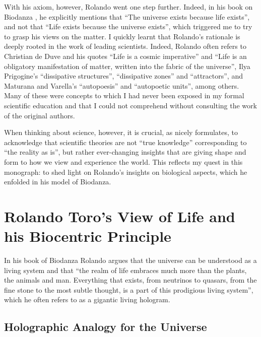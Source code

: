 \documentclass[
  11pt,
]{book}
\begin{document}
With his axiom, however, Rolando went one step further. Indeed, in his book on Biodanza \citep{toro2008}, he explicitly mentions that ``The universe exists because life exists'', and not that ``Life exists because the universe exists'', which triggered me to try to grasp his views on the matter. I quickly learnt that Rolando's rationale is deeply rooted in the work of leading scientists. Indeed, Rolando often refers to Christian de Duve and his quotes ``Life is a cosmic imperative'' and ``Life is an obligatory manifestation of matter, written into the fabric of the universe'', Ilya Prigogine's ``dissipative structures'', ``dissipative zones'' and ``attractors'', and Maturana and Varella's ``autopoesis'' and ``autopoetic units'', among others. Many of these were concepts to which I had never been exposed in my formal scientific education and that I could not comprehend without consulting the work of the original authors.

When thinking about science, however, it is crucial, as \citet{bohm1980} nicely formulates, to acknowledge that scientific theories are not ``true knowledge'' corresponding to ``the reality as is'', but rather ever-changing insights that are giving shape and form to how we view and experience the world. This reflects my quest in this monograph: to shed light on Rolando's insights on biological aspects, which he enfolded in his model of Biodanza.

\hypertarget{rolando-toros-view-of-life-and-his-biocentric-principle}{%
\section{Rolando Toro's View of Life and his Biocentric Principle}\label{rolando-toros-view-of-life-and-his-biocentric-principle}}

In his book of Biodanza Rolando argues that the universe can be understood as a living system and that ``the realm of life embraces much more than the plants, the animals and man. Everything that exists, from neutrinos to quasars, from the fine stone to the most subtle thought, is a part of this prodigious living system'', which he often refers to as a gigantic living hologram.

\hypertarget{holographic-analogy-for-the-universe}{%
\subsection{Holographic Analogy for the Universe}\label{holographic-analogy-for-the-universe}}
\end{document}
